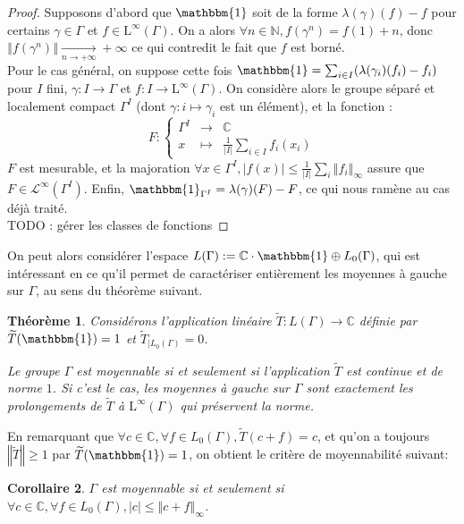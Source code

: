 \documentclass[a4paper,12pt]{article}
\newtheorem{theorem}{Théorème}[section]
\newtheorem{corollary}[theorem]{Corollaire}
\newcommand{\N}{\mathbb{N}}
\newcommand{\C}{\mathbb{C}}
\newcommand{\norm}[1]{\left\Vert #1\right\Vert}
\newcommand{\abs}[1]{\left\vert#1\right\vert}
\newcommand{\card}[1]{\abs{#1}}
\newcommand{\indic}{\mathbbm{1}}
\newcommand\fundef[3]{#1: \left\{\begin{array}{ccc}#2\\#3\end{array}\right.}
\newcommand{\ssi}{si et seulement si }
\newcommand{\TODO}[1]{{\color{red}TODO :} #1}
\begin{document}
\begin{proof}
    Supposons d'abord que $\indic$ soit de la forme $\lambda(\gamma)(f) - f$ pour certains $\gamma\in\Gamma$ et 
    $f\in\mathrm{L}^\infty(\Gamma)$. On a alors $\forall n\in\N, f(\gamma^n) = f(1) + n$, donc $\norm{f(\gamma^n)}\xrightarrow[n\to+\infty]{}+\infty$
    ce qui contredit le fait que $f$ est borné. \\
    Pour le cas général, on suppose cette fois $\indic = \sum_{i\in I} (\lambda(\gamma_i)(f_i) - f_i)$ pour $I$ fini, $\gamma : I \to\Gamma$ et
    $f : I\to\mathrm{L}^\infty(\Gamma)$. On considère alors le groupe séparé et localement compact $\Gamma^I$ (dont $\gamma : i\mapsto \gamma_i$ est
    un élément), et la fonction : 
    \begin{equation*}
        \fundef{F}{\Gamma^I&\to&\C}{x&\mapsto&\frac{1}{\card{I}}\sum_{i\in I}f_i(x_i)}
    \end{equation*}
    $F$ est mesurable, et la majoration
    $\forall x\in\Gamma^I, \abs{f(x)}\le\frac1{\card{I}}\sum_i\norm{f_i}_\infty$ assure que $F\in\mathscr{L}^\infty(\Gamma^I)$. 
    Enfin, $\indic_{\Gamma^I} = \lambda(\gamma)(F) - F$, ce qui nous ramène au cas déjà traité. \\
    \TODO{gérer les classes de fonctions}
\end{proof}

On peut alors considérer l'espace $L(\Gamma) := \C\cdot\indic \oplus L_0(\Gamma)$, qui est intéressant en ce qu'il permet de caractériser entièrement
les moyennes à gauche sur $\Gamma$, au sens du théorème suivant.

\begin{theorem}\label{left_mean_iff}
    Considérons l'application linéaire $\widetilde{T} : L(\Gamma)\to\C$ définie par $\widetilde{T}(\indic) = 1$
    et $\widetilde{T}_{|L_0(\Gamma)} = 0$. 
    
    Le groupe $\Gamma$ est moyennable \ssi l'application $\widetilde{T}$ est continue et de norme $1$.
    Si c'est le cas, les moyennes à gauche sur $\Gamma$ sont exactement les prolongements de $\widetilde{T}$ à 
    $\mathrm{L}^\infty(\Gamma)$ qui préservent la norme.
\end{theorem}

En remarquant que $\forall c\in\C, \forall f\in L_0(\Gamma), \widetilde{T}(c + f) = c$, et qu'on a toujours 
$\norm{\widetilde{T}}\ge1$ par $\widetilde{T}(\indic) = 1$, on obtient le critère de moyennabilité suivant:

\begin{corollary}\label{amenable_iff_L0}
    $\Gamma$ est moyennable \ssi $\forall c\in\C, \forall f\in L_0(\Gamma), \abs{c}\le\norm{c + f}_\infty$.
\end{corollary}
\end{document}
